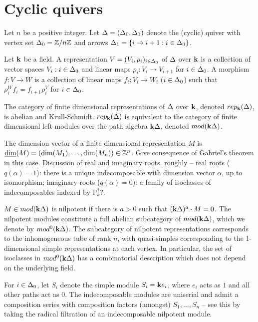 \documentclass[a4paper, 11pt]{report}
\begin{document}
\section{Cyclic quivers}

Let $n$ be a positive integer. Let $\Delta = (\Delta_0,\Delta_1)$ denote the (cyclic) quiver with vertex set $\Delta_0 = \mathbb{Z}/{n\mathbb{Z}}$ and arrows $\Delta_1 = \{i\to i+1: i \in\Delta_0\}$.

Let $\mathbf{k}$ be a field. A representation $V=(V_i,\rho_i)_{i\in\Delta_0}$ of $\Delta$ over $\mathbf{k}$ is a collection of vector spaces $V_i:i\in\Delta_0$ and linear maps $\rho_i\colon V_i\to V_{i+1}$ for $i\in\Delta_0$. A morphism $f\colon V\to W$ is a collection of linear maps $f_i\colon V_i\to W_i$ ($i\in\Delta_0$) such that $\rho^W_i f_i = f_{i+1}\rho^V_i$ for $i\in\Delta_0$.

The category of finite dimensional representations of $\Delta$ over $\mathbf{k}$, denoted $rep_{\mathbf{k}}(\Delta)$, is abelian and Krull-Schmidt. $rep_{\mathbf{k}}(\Delta)$ is equivalent to the category of finite dimensional left modules over the path algebra $\mathbf{k}\Delta$, denoted $mod(\mathbf{k}\Delta)$.

The dimension vector of a finite dimensional representation $M$ is $\underline{\dim}(M) = (\dim(M_1),\ldots,\dim(M_n))\in\mathbb{Z}^n$.
{\color{orange} Give consequence of Gabriel's theorem in this case. Discussion of real and imaginary roots. roughly -- real roots ($q(\alpha)=1$): there is a unique indecomposable with dimension vector $\alpha$, up to isomorphism; imaginary roots ($q(\alpha)=0$): a family of isoclasses of indecomposables indexed by $\mathbb{P}^1_k$?.}

$M\in mod(\mathbf{k}\Delta)$ is nilpotent if there is $a>0$ such that $(\mathbf{k}\Delta)^a\cdot M = 0$. The nilpotent modules constitute a full abelian subcategory of $mod(\mathbf{k}\Delta)$, which we denote by $mod^0(\mathbf{k}\Delta)$. The subcategory of nilpotent representations corresponds to the inhomogeneous tube of rank $n$, with quasi-simples corresponding to the 1-dimensional simple representations at each vertex. In particular, the set of isoclasses in $mod^0(\mathbf{k}\Delta)$ has a combinatorial description which does not depend on the underlying field.

For $i\in\Delta_0$, let $S_i$ denote the simple module $S_i = \mathbf{k} e_i$, where $e_i$ acts as $1$ and all other paths act as $0$. The indecomposable modules are uniserial and admit a composition series with composition factors (amongst) $S_1,\ldots,S_n$ -- see this by taking the radical filtration of an indecomposable nilpotent module.
\end{document}
